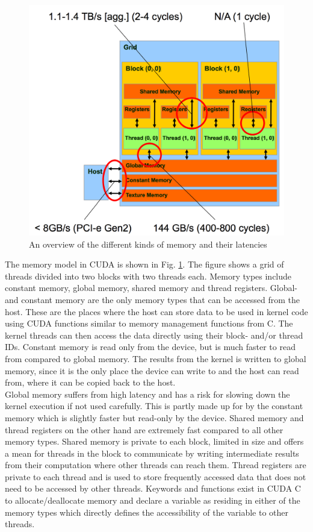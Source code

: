 \begin{figure}
\centerline{\includegraphics[width=\textwidth]{img/latenstid.png}} 
\caption{An overview of the different kinds of memory and their latencies}
\label{memorylatencies}
\end{figure}

The memory model in CUDA is shown in Fig. \ref{memorylatencies}. The figure shows a grid of threads divided into two blocks with two threads each. Memory types include constant memory, global memory, shared memory and thread registers. Global- and constant memory are the only memory types that can be accessed from the host. These are the places where the host can store data to be used in kernel code using CUDA functions similar to memory management functions from C. The kernel threads can then access the data directly using their block- and/or thread IDs. Constant memory is read only from the device, but is much faster to read from compared to global memory. The results from the kernel is written to global memory, since it is the only place the device can write to and the host can read from, where it can be copied back to the host.\\

Global memory suffers from high latency and has a risk for slowing down the kernel execution if not used carefully. This is partly made up for by the constant memory which is slightly faster but read-only by the device. Shared memory and thread registers on the other hand are extremely fast compared to all other memory types. Shared memory is private to each block, limited in size and offers a mean for threads in the block to communicate by writing intermediate results from their computation where other threads can reach them. Thread registers are private to each thread and is used to store frequently accessed data that does not need to be accessed by other threads. Keywords and functions exist in CUDA C to allocate/deallocate memory and declare a variable as residing in either of the memory types which directly defines the accessibility of the variable to other threads.